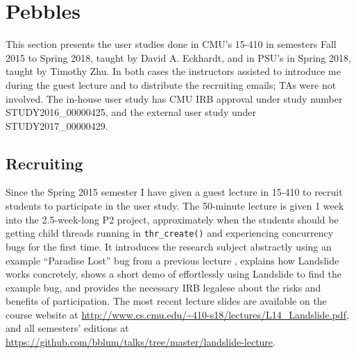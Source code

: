 
\section{Pebbles}

This section presents the user studies done in
CMU's 15-410 in semesters Fall 2015 to Spring 2018,
taught by David A. Eckhardt,
and in PSU's \psuos in Spring 2018,
taught by Timothy Zhu.
In both cases the instructors assisted to introduce me during the guest lecture
and to distribute the recruiting emails;
TAs were not involved.
The in-house user study has CMU IRB approval under study number STUDY2016\_00000425,
and the external user study under STUDY2017\_00000429.


\subsection{Recruiting}
\label{sec:education-pebbles-recruiting}

Since the Spring 2015 semester I have given a guest lecture in 15-410
to recruit students to participate in the user study.
The 50-minute lecture is given 1 week into the 2.5-week-long P2 project,
approximately when the students should be getting child threads running in {\tt thr\_create()}
and experiencing concurrency bugs for the first time.
It introduces the research subject abstractly
using an example ``Paradise Lost'' bug from a previous lecture \cite{paradise-lost},
explains how Landslide works concretely,
shows a short demo of effortlessly using Landslide to find the example bug,
and provides the necessary IRB legalese about the risks and benefits of participation.
The most recent lecture slides are available on the course website at
\url{http://www.cs.cmu.edu/~410-s18/lectures/L14_Landslide.pdf},
and all semesters' editions at
\url{https://github.com/bblum/talks/tree/master/landslide-lecture}.

